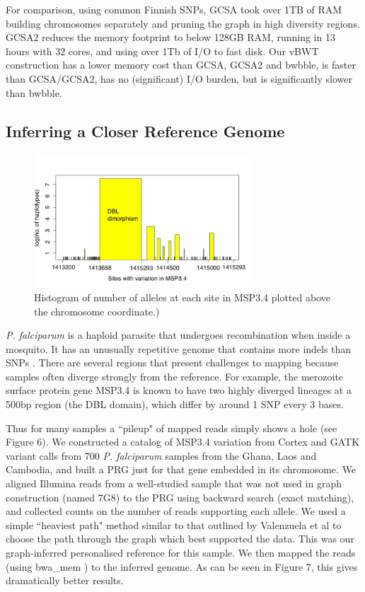\documentclass[runningheads,a4paper]{llncs}
\begin{document}
For comparison, using common Finnish SNPs, GCSA took over 1TB of RAM building chromosomes separately and pruning the graph in high diversity regions. GCSA2 reduces the memory footprint to below 128GB RAM, running in 13 hours with 32 cores, and using  over 1Tb of I/O to fast  disk.  Our vBWT construction has a lower  memory cost than GCSA, GCSA2 and bwbble,  is faster than GCSA/GCSA2, has no (significant) I/O burden, but is significantly slower than bwbble. 



\subsection{Inferring a Closer Reference Genome}

\begin{figure}
\centering
\includegraphics[height=5cm]{PRG.png}
\caption{Histogram of number of alleles at each site in MSP3.4 plotted above the chromosome coordinate.)}
\label{fig:example}
\end{figure}

\textit{P. falciparum} is a haploid parasite that undergoes recombination when inside a mosquito. It has an unusually  repetitive genome that contains more indels than SNPs \cite{miles}. There are several regions that present challenges to mapping because samples often diverge strongly from the reference. For example, the merozoite surface protein gene MSP3.4 is known to have two highly diverged lineages at a 500bp region (the DBL domain), which differ by around 1 SNP every 3 bases.




Thus for many samples a ``pileup" of mapped reads simply shows a hole (see Figure 6). We constructed a catalog of MSP3.4 variation from Cortex \cite{iqbal} and GATK \cite{depristo} variant calls from 700 \textit{P. falciparum} samples from the Ghana, Laos and Cambodia, and built a PRG just for that gene embedded in its chromosome. We aligned Illumina  reads from a well-studied sample that was not used in graph construction (named 7G8) to the PRG using backward search (exact matching), and collected counts on the number of reads supporting each allele. We used a simple ``heaviest path" method similar to that outlined by Valenzuela et al \cite{valen} to choose the path through the graph which best supported the data. This was our graph-inferred personalised reference for this sample. We then mapped the reads (using bwa\_mem \cite{hengli}) to the inferred genome. As can be seen in Figure 7,  this gives dramatically better results.
\end{document}

